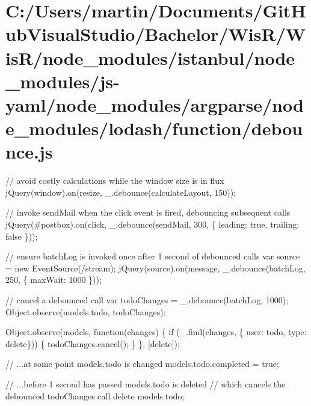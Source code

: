 \hypertarget{_c_1_2_users_2martin_2_documents_2_git_hub_visual_studio_2_bachelor_2_wis_r_2_wis_r_2node_modulefc33e0a2ba7e22734c3f333385b18d8c}{}\section{C\+:/\+Users/martin/\+Documents/\+Git\+Hub\+Visual\+Studio/\+Bachelor/\+Wis\+R/\+Wis\+R/node\+\_\+modules/istanbul/node\+\_\+modules/js-\/yaml/node\+\_\+modules/argparse/node\+\_\+modules/lodash/function/debounce.\+js}
// avoid costly calculations while the window size is in flux j\+Query(window).on(\textquotesingle{}resize\textquotesingle{}, \+\_\+.\+debounce(calculate\+Layout, 150));

// invoke {\ttfamily send\+Mail} when the click event is fired, debouncing subsequent calls j\+Query(\textquotesingle{}\#postbox\textquotesingle{}).on(\textquotesingle{}click\textquotesingle{}, \+\_\+.\+debounce(send\+Mail, 300, \{ \textquotesingle{}leading\textquotesingle{}\+: true, \textquotesingle{}trailing\textquotesingle{}\+: false \}));

// ensure {\ttfamily batch\+Log} is invoked once after 1 second of debounced calls var source = new Event\+Source(\textquotesingle{}/stream\textquotesingle{}); j\+Query(source).on(\textquotesingle{}message\textquotesingle{}, \+\_\+.\+debounce(batch\+Log, 250, \{ \textquotesingle{}max\+Wait\textquotesingle{}\+: 1000 \}));

// cancel a debounced call var todo\+Changes = \+\_\+.\+debounce(batch\+Log, 1000); Object.\+observe(models.\+todo, todo\+Changes);

Object.\+observe(models, function(changes) \{ if (\+\_\+.\+find(changes, \{ \textquotesingle{}user\textquotesingle{}\+: \textquotesingle{}todo\textquotesingle{}, \textquotesingle{}type\textquotesingle{}\+: \textquotesingle{}delete\textquotesingle{}\})) \{ todo\+Changes.\+cancel(); \} \}, \mbox{[}\textquotesingle{}delete\textquotesingle{}\mbox{]});

// ...at some point {\ttfamily models.\+todo} is changed models.\+todo.\+completed = true;

// ...before 1 second has passed {\ttfamily models.\+todo} is deleted // which cancels the debounced {\ttfamily todo\+Changes} call delete models.\+todo;


